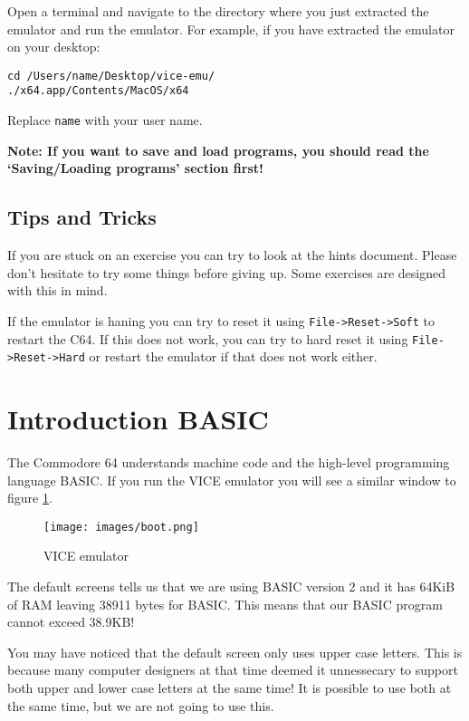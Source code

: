 \documentclass{article}
\begin{document}
Open a terminal and navigate to the directory where you just extracted the emulator and run the emulator. For example, if you have extracted the emulator on your desktop:
\begin{lstlisting}
cd /Users/name/Desktop/vice-emu/
./x64.app/Contents/MacOS/x64
\end{lstlisting}

Replace \verb:name: with your user name.

\textbf{Note: If you want to save and load programs, you should read the `Saving/Loading programs' section first!}

\subsection{Tips and Tricks}

If you are stuck on an exercise you can try to look at the hints document.
Please don't hesitate to try some things before giving up.
Some exercises are designed with this in mind.

If the emulator is haning you can try to reset it using \verb:File->Reset->Soft: to restart the C64.
If this does not work, you can try to hard reset it using \verb:File->Reset->Hard: or restart the emulator if that does not work either.

\section{Introduction BASIC}

The Commodore 64 understands machine code and the high-level programming language BASIC.
If you run the VICE emulator you will see a similar window to figure \ref{fig:vice}.

\begin{figure}
\centering
\texttt{[image: images/boot.png]}
\caption{VICE emulator}
\label{fig:vice}
\end{figure}

The default screens tells us that we are using BASIC version 2 and it has 64KiB of RAM leaving 38911 bytes for BASIC.
This means that our BASIC program cannot exceed 38.9KB!

You may have noticed that the default screen only uses upper case letters.
This is because many computer designers at that time deemed it unnessecary to support both upper and lower case letters at the same time!
It is possible to use both at the same time, but we are not going to use this.
\end{document}
